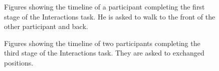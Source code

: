 \begin{figure}[!h]

  \caption{Figures showing the timeline of a participant completing the first stage of the Interactions task. He is asked to walk to the front of the other participant and back.}
  
  \label{fig:results_interaction_timeline}
\end{figure}

\begin{figure}[!h]
  \centering


  \caption{Figures showing the timeline of two participants completing the third stage of the Interactions task. They are asked to exchanged positions.}
  
  \label{fig:results_swap_timeline}
\end{figure}

